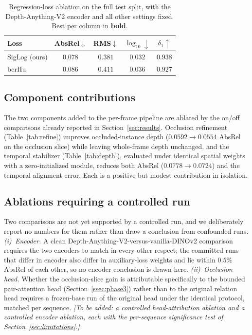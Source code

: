 \documentclass[sigconf, review=true]{acmart}
\begin{document}
\begin{table}[t]
\centering
\caption{Regression-loss ablation on the full test split, with the
Depth-Anything-V2 encoder and all other settings fixed. Best per column in
\textbf{bold}.}
\label{tab:ablation_loss}
\begin{tabular}{lcccc}
\toprule
Loss & AbsRel$\downarrow$ & RMS$\downarrow$ & $\log_{10}\downarrow$ & $\delta_1\uparrow$ \\
\midrule
SigLog (ours) & $\mathbf{0.078}$ & $\mathbf{0.381}$ & $\mathbf{0.032}$ & $\mathbf{0.938}$ \\
berHu         & $0.086$ & $0.411$ & $0.036$ & $0.927$ \\
\bottomrule
\end{tabular}
\end{table}

\subsection{Component contributions}
The two components added to the per-frame pipeline are ablated by the on/off
comparisons already reported in Section~\ref{sec:results}. Occlusion refinement
(Table~\ref{tab:refine}) improves occluded-instance depth
($0.0592\!\rightarrow\!0.0554$ AbsRel on the occlusion slice) while leaving
whole-frame depth unchanged, and the temporal stabilizer (Table~\ref{tab:depth}),
evaluated under identical spatial weights with a zero-initialized module,
reduces both AbsRel ($0.0778\!\rightarrow\!0.0724$) and the temporal alignment
error. Each is a positive but modest contribution in isolation.

\subsection{Ablations requiring a controlled run}
Two comparisons are not yet supported by a controlled run, and we deliberately
report no numbers for them rather than draw a conclusion from confounded runs.
\emph{(i)~Encoder.} A clean Depth-Anything-V2-versus-vanilla-DINOv2 comparison
requires the two encoders to match in every other respect; the committed runs
that differ in encoder also differ in auxiliary-loss weights and lie within
$0.5\%$ AbsRel of each other, so no encoder conclusion is drawn here.
\emph{(ii)~Occlusion head.} Whether the occlusion-slice gain is attributable
specifically to the bounded pair-attention head (Section~\ref{ssec:phase3})
rather than to the original relation head requires a frozen-base run of the
original head under the identical protocol, matched per sequence.
\emph{[To be added: a controlled head-attribution ablation and a controlled
encoder ablation, each with the per-sequence significance test of
Section~\ref{sec:limitations}.]}
\end{document}

